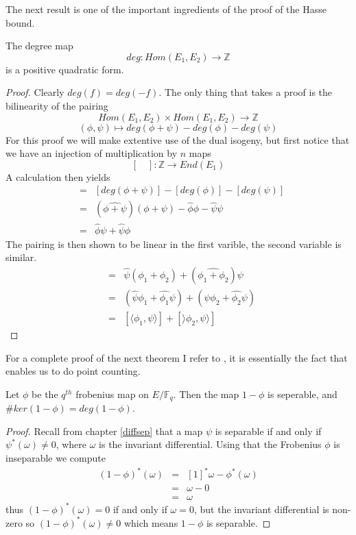 The next result is one of the important ingredients of the proof of the Hasse bound.
\begin{prop}
 The degree map
$$ deg: Hom(E_1, E_2) \rightarrow \mathbb{Z} $$
is a positive quadratic form.
\end{prop}
\begin{proof}
 Clearly $deg(f) = deg(-f)$. The only thing that takes a proof is the
bilinearity of the pairing
$$ Hom(E_1, E_2) \times Hom(E_1, E_2) \rightarrow \mathbb{Z}$$
$$ (\phi, \psi) \mapsto deg(\phi + \psi) - deg(\phi) - deg(\psi) $$
For this proof we will make extentive use of the dual isogeny, but first
notice that we have an injection of multiplication by $n$ maps
$$ [\quad]: \mathbb{Z} \rightarrow End(E_1) $$
A calculation then yields 
\begin{eqnarray*} 
 [\langle \phi,\psi \rangle] &=& [deg(\phi+\psi)]-[deg(\phi)]-[deg(\psi)] \nonumber \\
               &=& (\widehat{\phi+\psi})(\phi+\psi) - \widehat{\phi}\phi - \widehat{\psi}\psi \nonumber \\
	       &=& \widehat{\phi}\psi + \widehat{\psi}\phi
\end{eqnarray*}
The pairing is then shown to be linear in the first varible, the second variable is
similar.
\begin{eqnarray*}
 [\langle \phi_1+\phi_2, \psi \rangle] &=& \widehat{\psi}(\phi_1+\phi_2) + (\widehat{\phi_1+\phi_2})\psi \nonumber \\
			 &=& (\widehat{\psi}\phi_1+\widehat{\phi_1}\psi) + (\widehat{\psi}\phi_2 + \widehat{\phi_2}\psi) \nonumber \\
			 &=& [\langle \phi_1,\psi \rangle] + [\rangle \phi_2,\psi \rangle] 
\end{eqnarray*}
\end{proof}

For a complete proof of the next theorem I refer to \cite{AEC}, it is essentially the fact that enables
us to do point counting.

\begin{thm} \label{frobkernel}
 Let $\phi$ be the $q^{th}$ frobenius map on $E/\mathbb{F}_q$. Then the map $1-\phi$ is seperable, and
$\#ker(1-\phi) = deg(1-\phi)$.
\end{thm}
\begin{proof}
  Recall from chapter \ref{diffsep} that a map $\psi$ is separable if and only if $\psi^*(\omega) \neq 0$,
where $\omega$ is the invariant differential. Using that the Frobenius $\phi$ is inseparable \cite{AEC}
we compute
\begin{eqnarray}
 (1-\phi)^*(\omega) &=& [1]^*\omega - \phi^*(\omega) \nonumber \\
		    &=& \omega - 0 \nonumber \\
		    &=& \omega \nonumber
\end{eqnarray}
thus $(1-\phi)^*(\omega) = 0$ if and only if $\omega = 0$, but the invariant differential is non-zero
so $(1-\phi)^*(\omega) \neq 0$ which means $1-\phi$ is separable.
\end{proof}

